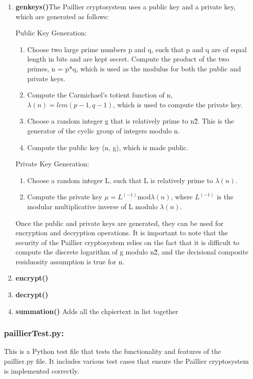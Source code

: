 \documentclass{article}
\begin{document}
\begin{enumerate}
    \item \textbf{genkeys()}The Paillier cryptosystem uses a public key and a private key, which are generated as follows:

Public Key Generation:
\begin{enumerate}
    \item Choose two large prime numbers p and q, such that p and q are of equal length in bits and are kept secret.
Compute the product of the two primes, n = p*q, which is used as the modulus for both the public and private keys.
    \item Compute the Carmichael's totient function of n, $\lambda(n) = lcm(p-1, q-1)$, which is used to compute the private key.
    \item Choose a random integer g that is relatively prime to n\^2. This is the generator of the cyclic group of integers modulo n.
    \item Compute the public key (n, g), which is made public.
\end{enumerate}
Private Key Generation:
\begin{enumerate}
    \item Choose a random integer L, such that L is relatively prime to $\lambda(n)$.
    \item Compute the private key $\mu = L^{(-1)} $mod$ \lambda(n)$, where $L^{(-1)}$ is the modular multiplicative inverse of L modulo $\lambda(n)$.
\end{enumerate}
Once the public and private keys are generated, they can be used for encryption and decryption operations.
It is important to note that the security of the Paillier cryptosystem relies on the fact that it is difficult to compute the discrete logarithm of g modulo n\^2, and the decisional composite residuosity assumption is true for n.

\item  \textbf{encrypt()}
\item  \textbf{decrypt()}

    \item  \textbf{summation()}
    Adds all the chpiertext in list together
\end{enumerate}

\subsubsection{paillierTest.py:} This is a Python test file that tests the functionality and features of the paillier.py file.
It includes various test cases that ensure the Paillier cryptosystem is implemented correctly.
\end{document}
